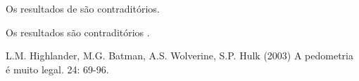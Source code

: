 

Os resultados de \cite{highlander:2003} são contraditórios.

Os resultados são contraditórios \citep{highlander:2003}.


\begin{footnotesize}
\begin{thebibliography}{99}



L.M. Highlander, M.G. Batman, A.S. Wolverine, S.P. Hulk (2003)
\newblock A pedometria é muito legal.
 24: 69-96.





\end{thebibliography}
\end{footnotesize}



